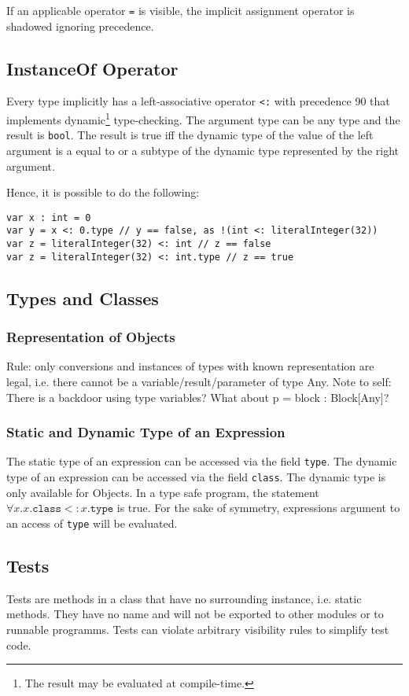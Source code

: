 If an applicable operator \texttt{=} is visible, the implicit assignment operator is shadowed ignoring precedence.

\subsection{InstanceOf Operator}

Every type implicitly has a left-associative operator \texttt{<:} with precedence 90 that implements dynamic\footnote{The result may be evaluated at compile-time.} type-checking.
The argument type can be any type and the result is \texttt{bool}.
The result is true iff the dynamic type of the value of the left argument is a equal to or a subtype of the dynamic type represented by the right argument.


Hence, it is possible to do the following:
\begin{lstlisting}[language=tyr]
var x : int = 0
var y = x <: 0.type // y == false, as !(int <: literalInteger(32))
var z = literalInteger(32) <: int // z == false
var z = literalInteger(32) <: int.type // z == true
\end{lstlisting}

\subsection{Types and Classes}

\subsubsection{Representation of Objects}

Rule: only conversions and instances of types with known representation are legal, i.e. there cannot be a variable/result/parameter of type Any.
Note to self: There is a backdoor using type variables?
What about p = block : Block[Any]?

\subsubsection{Static and Dynamic Type of an Expression}

The static type of an expression can be accessed via the field \texttt{type}.
The dynamic type of an expression can be accessed via the field \texttt{class}.
The dynamic type is only available for Objects.
In a type safe program, the statement $\forall x. x\texttt{.class} <: x\texttt{.type}$ is true.
For the sake of symmetry, expressions argument to an access of \texttt{type} will be evaluated.

\subsection{Tests}

Tests are methods in a class that have no surrounding instance, i.e. static methods.
They have no name and will not be exported to other modules or to runnable programms.
Tests can violate arbitrary visibility rules to simplify test code.